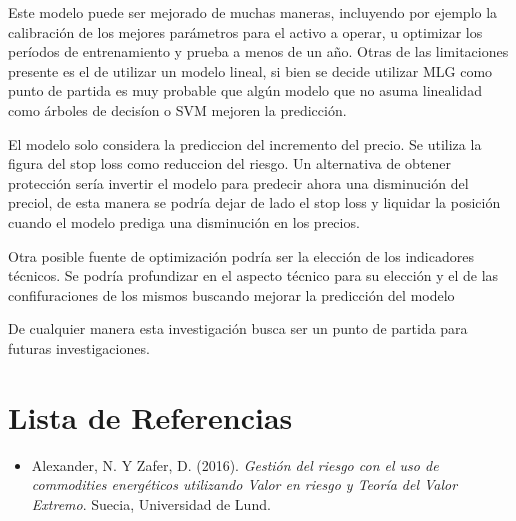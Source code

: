 \documentclass[a4paper,12pt]{Latex/Classes/PhDthesisPSnPDF}
\begin{document}
Este modelo puede ser mejorado de muchas maneras, incluyendo por ejemplo la calibración de los mejores parámetros para el activo a operar, u optimizar los períodos de entrenamiento y prueba a menos de un año. Otras de las limitaciones presente es el de utilizar un modelo lineal, si bien se decide utilizar MLG como punto de partida es muy probable que algún modelo que no asuma linealidad como árboles de decisíon o SVM mejoren la predicción. 

El modelo solo considera la prediccion del incremento del precio. Se utiliza la figura del stop loss como reduccion del riesgo. Un alternativa de obtener protección sería invertir el modelo para predecir ahora una disminución del preciol, de esta manera se podría dejar de lado el stop loss y liquidar la posición cuando el modelo prediga una disminución en los precios.

Otra posible fuente de optimización podría ser la elección de los indicadores técnicos. Se podría profundizar en el aspecto técnico para su elección y el de las confifuraciones de los mismos buscando mejorar la predicción del modelo

De cualquier manera esta investigación busca ser un punto de partida para futuras investigaciones.



\chapter*{Lista de Referencias}

\begin{itemize}

\item Alexander, N. Y Zafer, D. (2016). \textit{Gestión del riesgo con el uso de commodities energéticos utilizando Valor en riesgo y Teoría del Valor Extremo}. Suecia, Universidad de Lund.

\end{itemize}
\end{document}
